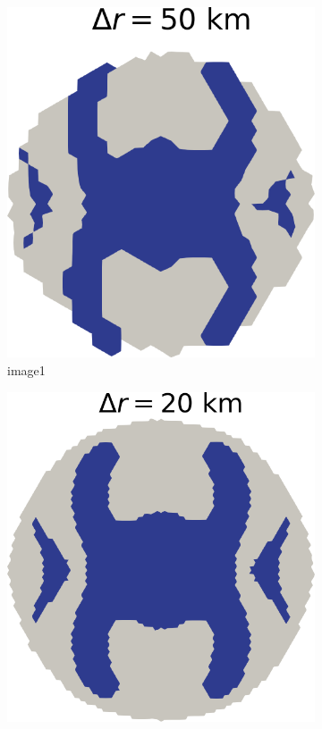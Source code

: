 \documentclass{article}
\begin{document}
\begin{figure}[!h]
	\centering %
	\begin{subfigure}{0.25\textwidth}
		\includegraphics[width=\linewidth]{../fig/Grounded_zone_50km.png}
		\caption{image1}
		\label{fig:1}
	\end{subfigure}\hfil %
	\begin{subfigure}{0.25\textwidth}
		\includegraphics[width=\linewidth]{../fig/Grounded_zone_20km.png}

\end{subfigure}
\end{figure}
\end{document}

